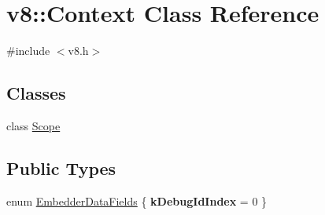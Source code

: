 \hypertarget{classv8_1_1_context}{}\section{v8\+:\+:Context Class Reference}
\label{classv8_1_1_context}


{\ttfamily \#include $<$v8.\+h$>$}

\subsection*{Classes}
\begin{DoxyCompactItemize}
\item 
class \hyperlink{classv8_1_1_context_1_1_scope}{Scope}
\end{DoxyCompactItemize}
\subsection*{Public Types}
\begin{DoxyCompactItemize}
\item 
enum \hyperlink{classv8_1_1_context_a8e8a8c567e2d193f25f1ec211db0b5f9}{Embedder\+Data\+Fields} \{ {\bfseries k\+Debug\+Id\+Index} = 0
 \}
\end{DoxyCompactItemize}
